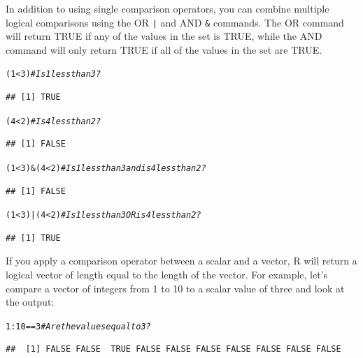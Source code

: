 \documentclass{tufte-book}\usepackage[]{graphicx}\usepackage[]{color}
\makeatletter
\newcommand{\hlnum}[1]{\textcolor[rgb]{0.686,0.059,0.569}{#1}}%
\newcommand{\hlcom}[1]{\textcolor[rgb]{0.678,0.584,0.686}{\textit{#1}}}%
\newcommand{\hlopt}[1]{\textcolor[rgb]{0,0,0}{#1}}%
\newcommand{\hlstd}[1]{\textcolor[rgb]{0.345,0.345,0.345}{#1}}%
\newenvironment{kframe}{%
 \def\at@end@of@kframe{}%
 \ifinner\ifhmode%
  \def\at@end@of@kframe{\end{minipage}}%
  \begin{minipage}{\columnwidth}%
 \fi\fi%
 \def\FrameCommand##1{\hskip\@totalleftmargin \hskip-\fboxsep
 \colorbox{shadecolor}{##1}\hskip-\fboxsep
     \hskip-\linewidth \hskip-\@totalleftmargin \hskip\columnwidth}%
 \MakeFramed {\advance\hsize-\width
   \@totalleftmargin\z@ \linewidth\hsize
   \@setminipage}}%
 {\par\unskip\endMakeFramed%
 \at@end@of@kframe}
\newenvironment{knitrout}{}{} %
\makeatother
\begin{document}
In addition to using single comparison operators, you can combine multiple logical comparisons using the OR \texttt{|} and AND \texttt{\&} commands. The OR command will return TRUE if any of the values in the set is TRUE, while the AND command will only return TRUE if all of the values in the set are TRUE.


\begin{knitrout}
\color{fgcolor}\begin{kframe}
\begin{alltt}
\hlstd{(}\hlnum{1} \hlopt{<} \hlnum{3}\hlstd{)} \hlcom{# Is 1 less than 3?}
\end{alltt}
\begin{verbatim}
## [1] TRUE
\end{verbatim}
\begin{alltt}
\hlstd{(}\hlnum{4} \hlopt{<} \hlnum{2}\hlstd{)} \hlcom{# Is 4 less than 2?}
\end{alltt}
\begin{verbatim}
## [1] FALSE
\end{verbatim}
\begin{alltt}
\hlstd{(}\hlnum{1} \hlopt{<} \hlnum{3}\hlstd{)} \hlopt{&} \hlstd{(}\hlnum{4} \hlopt{<} \hlnum{2}\hlstd{)} \hlcom{# Is 1 less than 3 and is 4 less than 2?}
\end{alltt}
\begin{verbatim}
## [1] FALSE
\end{verbatim}
\begin{alltt}
\hlstd{(}\hlnum{1} \hlopt{<} \hlnum{3}\hlstd{)} \hlopt{|} \hlstd{(}\hlnum{4} \hlopt{<} \hlnum{2}\hlstd{)} \hlcom{# Is 1 less than 3 OR is 4 less than 2?}
\end{alltt}
\begin{verbatim}
## [1] TRUE
\end{verbatim}
\end{kframe}
\end{knitrout}


If you apply a comparison operator between a scalar and a vector, R will return a logical vector of length equal to the length of the vector. For example, let's compare a vector of integers from 1 to 10 to a scalar value of three and look at the output:


\begin{knitrout}
\color{fgcolor}\begin{kframe}
\begin{alltt}
\hlnum{1}\hlopt{:}\hlnum{10} \hlopt{==} \hlnum{3} \hlcom{# Are the values equal to 3?}
\end{alltt}
\begin{verbatim}
##  [1] FALSE FALSE  TRUE FALSE FALSE FALSE FALSE FALSE FALSE FALSE
\end{verbatim}
\end{kframe}
\end{knitrout}
\end{document}
